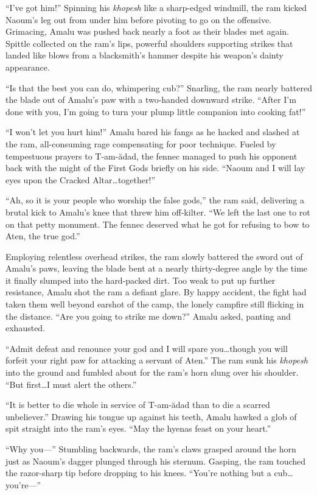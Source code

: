 ``I've got him!'' Spinning his \emph{khopesh} like a sharp-edged windmill, the ram kicked Naoum's leg out from under him before pivoting to go on the offensive. Grimacing, Amalu was pushed back nearly a foot as their blades met again. Spittle collected on the ram's lips, powerful shoulders supporting strikes that landed like blows from a blacksmith's hammer despite his weapon's dainty appearance.

``Is that the best you can do, whimpering cub?'' Snarling, the ram nearly battered the blade out of Amalu's paw with a two-handed downward strike. ``After I'm done with you, I'm going to turn your plump little companion into cooking fat!''

``I won't let you hurt him!'' Amalu bared his fangs as he hacked and slashed at the ram, all-consuming rage compensating for poor technique. Fueled by tempestuous prayers to T-am-ădad, the fennec managed to push his opponent back with the might of the First Gods briefly on his side. ``Naoum and I will lay eyes upon the Cracked Altar\ldots together!''

``Ah, so it is your people who worship the false gods,'' the ram said, delivering a brutal kick to Amalu's knee that threw him off-kilter. ``We left the last one to rot on that petty monument. The fennec deserved what he got for refusing to bow to Aten, the true god.''

Employing relentless overhead strikes, the ram slowly battered the sword out of Amalu's paws, leaving the blade bent at a nearly thirty-degree angle by the time it finally slumped into the hard-packed dirt. Too weak to put up further resistance, Amalu shot the ram a defiant glare. By happy accident, the fight had taken them well beyond earshot of the camp, the lonely campfire still flicking in the distance. ``Are you going to strike me down?'' Amalu asked, panting and exhausted.

``Admit defeat and renounce your god and I will spare you\ldots though you will forfeit your right paw for attacking a servant of Aten.'' The ram sunk his \emph{khopesh} into the ground and fumbled about for the ram's horn slung over his shoulder. ``But first\ldots I must alert the others.''

``It is better to die whole in service of T-am-ădad than to die a scarred unbeliever.'' Drawing his tongue up against his teeth, Amalu hawked a glob of spit straight into the ram's eyes. ``May the hyenas feast on your heart.''

``Why you---'' Stumbling backwards, the ram's claws grasped around the horn just as Naoum's dagger plunged through his sternum. Gasping, the ram touched the razor-sharp tip before dropping to his knees. ``You're nothing but a cub\ldots you're---''

